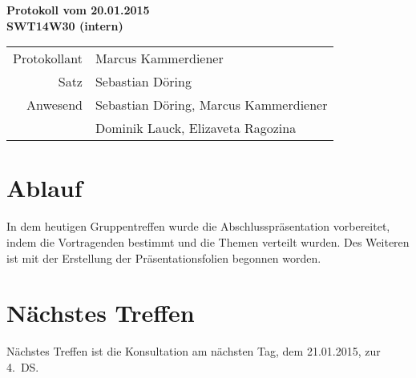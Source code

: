 \documentclass{scrartcl}
\begin{document}
\begin{center}
\LARGE \bf{Protokoll vom 20.01.2015 \\
SWT14W30 (intern)}
\end{center}

\begin{tabular}{rp{10cm}}
Protokollant & Marcus Kammerdiener \\
Satz & Sebastian Döring \\
Anwesend & Sebastian Döring, Marcus Kammerdiener \\
         & Dominik Lauck, Elizaveta Ragozina \\
\end{tabular}

\vspace*{3em}

\section{Ablauf}
In dem heutigen Gruppentreffen wurde die Abschlusspräsentation vorbereitet, indem die Vortragenden bestimmt und die Themen verteilt wurden. Des Weiteren ist mit der Erstellung der Präsentationsfolien begonnen worden.

\vspace*{1em}

\section{N\"achstes Treffen}
Nächstes Treffen ist die Konsultation am nächsten Tag, dem 21.01.2015, zur 4.~DS.
\end{document}
